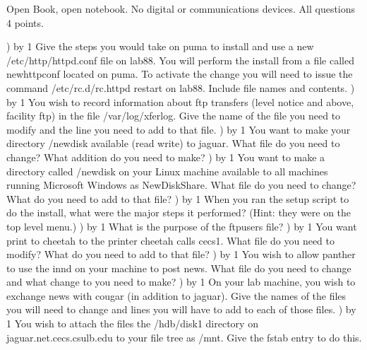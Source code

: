 
\parindent=0in
\nopagenumbers
\newcount\quesno
{}
\def\ques{\number\quesno) \advance\quesno by 1}
\def\aspace{\vskip 1.5in}

Open Book, open notebook. No digital or communications devices.
All questions 4 points.

\ques
Give the steps you would take on {\ltt{}puma} to install and use
a new {\ltt{}/etc/http/httpd.conf} file on {\ltt{}lab88}.
You will perform the install from a file called {\ltt{}newhttpconf}
located on {\ltt{}puma}.
To activate the change you will need to issue the command
{\ltt{}/etc/rc.d/rc.httpd restart} on {\ltt{}lab88}.
Include file names and contents.
\vskip 2.4in
\ques
You wish to record information about ftp transfers
(level {\ltt{}notice} and above, facility {\ltt{}ftp}) in
the file {\ltt{}/var/log/xferlog}.
Give the name of the file you need to modify and the line you need to
add to that file.
\vskip 1.0in
\ques
You want to make your directory 
{\ltt{}/newdisk}
available (read write) to {\ltt{}jaguar}.
What file do you need to change?
What addition do you need to make?
\vskip 1.2in
\ques
You want to make a directory called {\ltt{}/newdisk} on your
Linux machine available to all machines running Microsoft Windows as
{\ltt{}NewDiskShare}.
What file do you need to change?
What do you need to add to that file?
\vskip 1.2in
\vfill\eject
\ques
When you ran the setup script to do the install,
what were the major steps it performed?
(Hint: they were on the top level menu.)
\vskip 1.8in
\ques
What is the purpose of the {\ltt{}ftpusers} file?
\vskip 1.0in
\ques
You want print to {\ltt{}cheetah} to the printer cheetah calls {\ltt{}cecs1}.
What file do you need to modify?
What do you need to add to that file?
\vskip 1.2in
\ques
You wish to allow {\ltt{}panther} to use the {\ltt{}innd} on your machine
to post news.
What file do you need to change and what change to you need to make?
\vskip 1.2in
\ques
On your lab machine, you wish to exchange news with {\ltt{}cougar}
(in addition to {\ltt{}jaguar}).
Give the names of the files you will need to change and lines you
will have to add to each of those files.
\vskip 2.2in
\vfill\eject
\ques
You wish to attach the files the
{\ltt{}/hdb/disk1} directory on {\ltt{}jaguar.net.cecs.csulb.edu}
to your file tree as {\ltt{}/mnt}.
Give the {\ltt{}fstab} entry to do this.
